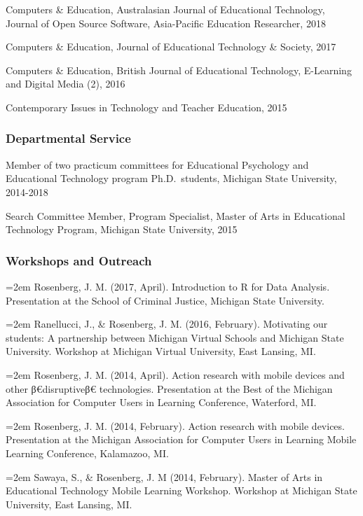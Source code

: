 \documentclass[]{article}
\newcommand{\euro}{€}
\begin{document}
Computers \& Education, Australasian Journal of Educational Technology,
Journal of Open Source Software, Asia-Pacific Education Researcher, 2018

Computers \& Education, Journal of Educational Technology \& Society,
2017

Computers \& Education, British Journal of Educational Technology,
E-Learning and Digital Media (2), 2016

Contemporary Issues in Technology and Teacher Education, 2015

\subsubsection{Departmental Service}\label{departmental-service}

Member of two practicum committees for Educational Psychology and
Educational Technology program Ph.D.~students, Michigan State
University, 2014-2018

Search Committee Member, Program Specialist, Master of Arts in
Educational Technology Program, Michigan State University, 2015

\subsubsection{Workshops and Outreach}\label{workshops-and-outreach}

\hangindent=2em Rosenberg, J. M. (2017, April). Introduction to R for
Data Analysis. Presentation at the School of Criminal Justice, Michigan
State University.

\hangindent=2em Ranellucci, J., \& Rosenberg, J. M. (2016, February).
Motivating our students: A partnership between Michigan Virtual Schools
and Michigan State University. Workshop at Michigan Virtual University,
East Lansing, MI.

\hangindent=2em Rosenberg, J. M. (2014, April). Action research with
mobile devices and other β\euro{}disruptiveβ\euro{} technologies.
Presentation at the Best of the Michigan Association for Computer Users
in Learning Conference, Waterford, MI.

\hangindent=2em Rosenberg, J. M. (2014, February). Action research with
mobile devices. Presentation at the Michigan Association for Computer
Users in Learning Mobile Learning Conference, Kalamazoo, MI.

\hangindent=2em Sawaya, S., \& Rosenberg, J. M (2014, February). Master
of Arts in Educational Technology Mobile Learning Workshop. Workshop at
Michigan State University, East Lansing, MI.
\end{document}
